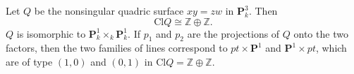 Let $Q$ be the nonsingular quadric surface $xy = zw$ in $\mathbf{P}_k^3$. Then
$$\text{Cl} Q \cong \mathbb{Z} \oplus \mathbb{Z}.$$
$Q$ is isomorphic to $\mathbf{P}_k^1 \times_k \mathbf{P}_k^1$. If $p_1$ and $p_2$ are the projections of $Q$ onto the two factors, then the two families of lines correspond to $pt \times \mathbf{P}^1$ and $\mathbf{P}^1 \times pt$, which are of type $(1,0)$ and $(0,1)$ in $\text{Cl} Q = \mathbb{Z} \oplus \mathbb{Z}$.
